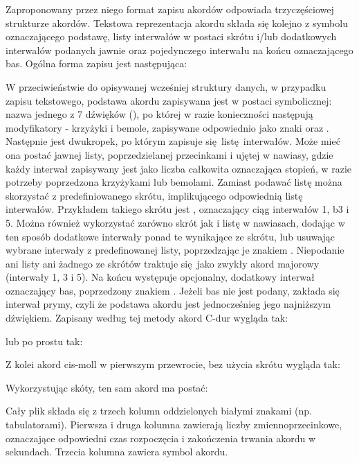 Zaproponowany przez niego format zapisu akordów odpowiada trzyczęściowej strukturze akordów.  Tekstowa reprezentacja akordu składa się kolejno z symbolu oznaczającego podstawę, listy interwałów w postaci skrótu i/lub dodatkowych interwałów podanych jawnie oraz pojedynczego interwału na końcu oznaczającego bas. Ogólna forma zapisu jest następująca: 
\begin{center}
\end{center}
W przeciwieństwie do opisywanej wcześniej struktury danych, w przypadku zapisu tekstowego, podstawa akordu zapisywana jest w postaci symbolicznej: nazwa jednego z 7 dźwięków (), po której w razie konieczności następują modyfikatory - krzyżyki i bemole, zapisywane odpowiednio jako znaki \code{\#} oraz . Następnie jest dwukropek, po którym zapisuje się listę interwałów. Może mieć ona postać jawnej listy, poprzedzielanej przecinkami i ujętej w nawiasy, gdzie każdy interwał zapisywany jest jako liczba całkowita oznaczająca stopień, w razie potrzeby poprzedzona krzyżykami lub bemolami. Zamiast podawać listę można skorzystać z predefiniowanego skrótu, implikującego odpowiednią listę interwałów. Przykładem takiego skrótu jest , oznaczający ciąg interwałów 1, b3 i 5. Można również wykorzystać zarówno skrót jak i listę w nawiasach, dodając w ten sposób dodatkowe interwały ponad te wynikające ze skrótu, lub usuwając wybrane interwały z predefinowanej listy, poprzedzając je znakiem \code{*}. Niepodanie ani listy ani żadnego ze skrótów traktuje się jako zwykły akord majorowy (interwały 1, 3 i 5). Na końcu występuje opcjonalny, dodatkowy interwał oznaczający bas, poprzedzony znakiem \code{/}. Jeżeli bas nie jest podany, zakłada się interwał prymy, czyli że podstawa akordu jest jednocześnieg jego najniższym dźwiękiem. Zapisany według tej metody akord C-dur wygląda tak:
\begin{center}
\end{center}
lub po prostu tak:
\begin{center}
\end{center}
Z kolei akord cis-moll w pierwszym przewrocie, bez użycia skrótu wygląda tak:
\begin{center}
\end{center}
Wykorzystując skóty, ten sam akord ma postać:
\begin{center}
\end{center}
Cały plik  składa się z trzech kolumn oddzielonych białymi znakami (np. tabulatorami).  Pierwsza i druga kolumna zawierają liczby zmiennoprzecinkowe, oznaczające odpowiedni czas rozpoczęcia i zakończenia trwania akordu w sekundach. Trzecia kolumna zawiera symbol akordu.

